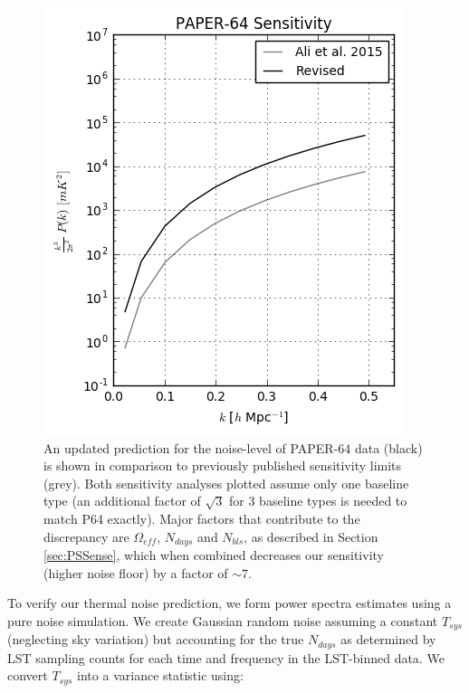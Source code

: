 \documentclass[preprint2,numberedappendix,tighten]{aastex6}  %
\begin{document}
\begin{figure}
	\centering
	\includegraphics[width=\columnwidth]{plots/sense_check.png}
	\caption{An updated prediction for the noise-level of PAPER-64 data (black) is shown in comparison to previously published sensitivity limits (grey). Both sensitivity analyses plotted assume only one baseline type (an additional factor of $\sqrt{3}$ for 3 baseline types is needed to match P64 exactly). Major factors that contribute to the discrepancy are $\Omega_{eff}$, $N_{days}$ and $N_{bls}$, as described in Section \ref{sec:PSSense}, which when combined decreases our sensitivity (higher noise floor) by a factor of $\sim7$.}
	\label{fig:sense_check}
\end{figure}

To verify our thermal noise prediction, we form power spectra estimates using a pure noise simulation. We create Gaussian random noise assuming a constant $T_{sys}$ (neglecting sky variation) but accounting for the true $N_{days}$ as determined by LST sampling counts for each time and frequency in the LST-binned data. We convert $T_{sys}$ into a variance statistic using:
\end{document}
